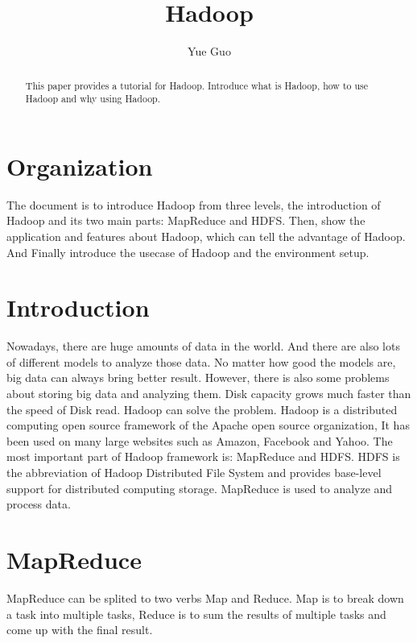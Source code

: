 
\title{Hadoop}



\author{Yue Guo}

\begin{abstract}
This paper provides a tutorial for Hadoop. Introduce what is Hadoop, how to use
 Hadoop and why using Hadoop.
\end{abstract}



\maketitle

\section{Organization}
The document is to introduce Hadoop from three levels, the introduction of Hadoop
 and its  two main parts: MapReduce and HDFS. Then, show the application and 
 features about Hadoop, which can tell the advantage of Hadoop. And Finally 
 introduce the usecase of Hadoop and the environment setup.

\section{Introduction}
Nowadays, there are huge amounts of data in the world. And there are also lots of
 different models to analyze those data. No matter how good the models are, big 
 data can always bring better result. However, there is also some problems about
  storing big data and analyzing them. Disk capacity grows much faster than the 
  speed of Disk read. Hadoop can solve the problem. Hadoop is a distributed 
  computing open source framework of the Apache open source organization, It has 
  been used on many large websites such as Amazon, Facebook and Yahoo. The most 
  important part of Hadoop framework is: MapReduce and HDFS. HDFS is the abbreviation 
  of Hadoop Distributed File System and provides base-level support for distributed 
  computing storage. MapReduce is used to analyze and process data.

\section{MapReduce}
MapReduce can be splited to two verbs Map and Reduce. Map is to break down a task 
into multiple tasks, Reduce is to sum the results of multiple tasks and come up 
with the final result. 

